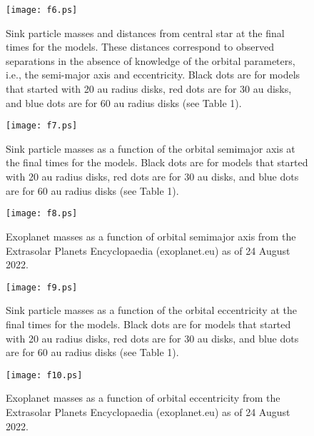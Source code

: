 \documentclass[12pt,preprint]{aastex}
\begin{document}
\begin{figure}
\vspace{-1.0in}
\texttt{[image: f6.ps]}
\vspace{0.5in}
\caption{Sink particle masses and distances from central star at the final times for the 
models. These distances correspond to observed separations in the absence of knowledge
of the orbital parameters, i.e., the semi-major axis and eccentricity. Black dots are for
models that started with 20 au radius disks, red dots are for 30 au disks, and blue
dots are for 60 au radius disks (see Table 1).}
\end{figure}
\clearpage


\begin{figure}
\vspace{-1.0in}
\texttt{[image: f7.ps]}
\vspace{0.5in}
\caption{Sink particle masses as a function of the orbital semimajor axis at the final times 
for the models. Black dots are for
models that started with 20 au radius disks, red dots are for 30 au disks, and blue
dots are for 60 au radius disks (see Table 1).}
\end{figure}
\clearpage

\begin{figure}
\vspace{-1.0in}
\texttt{[image: f8.ps]}
\vspace{0.5in}
\caption{Exoplanet masses as a function of orbital semimajor axis from the Extrasolar
Planets Encyclopaedia (exoplanet.eu) as of 24 August 2022.}
\end{figure}
\clearpage

\begin{figure}
\vspace{-1.0in}
\texttt{[image: f9.ps]}
\vspace{0.5in}
\caption{Sink particle masses as a function of the orbital eccentricity at the final times 
for the models. Black dots are for
models that started with 20 au radius disks, red dots are for 30 au disks, and blue
dots are for 60 au radius disks (see Table 1).}
\end{figure}
\clearpage



\begin{figure}
\vspace{-1.0in}
\texttt{[image: f10.ps]}
\vspace{0.5in}
\caption{Exoplanet masses as a function of orbital eccentricity from the Extrasolar
Planets Encyclopaedia (exoplanet.eu) as of 24 August 2022.}
\end{figure}
\clearpage
\end{document}

